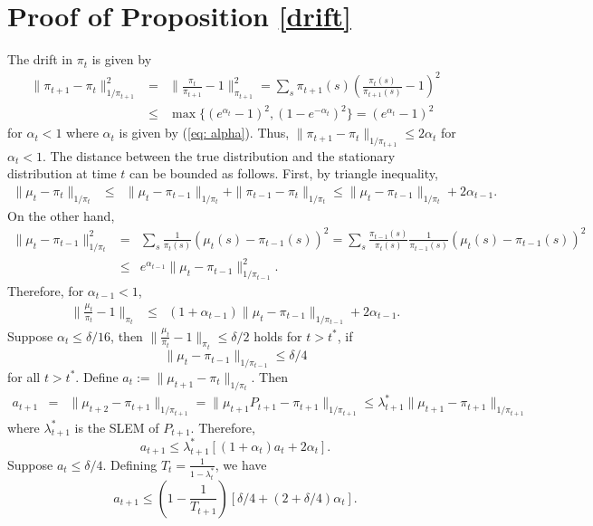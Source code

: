 \documentclass[10pt,onecolumn,draftclsnofoot,journal]{IEEEtran}
\begin{document}
\section{Proof of Proposition \ref{drift}}
The drift in $\pi_t$ is given by
\begin{eqnarray*}
\|\pi_{t+1}-\pi_t\|^2_{1/\pi_{t+1}} &=&\|\frac{\pi_{t}}{\pi_{t+1}}-1\|^2_{\pi_{t+1}} = \sum_s \pi_{t+1}(s)(\frac{\pi_{t}(s)}{\pi_{t+1}(s)}-1)^2\\
& \leq & \max \{(e^{\alpha_t}-1)^2,(1-e^{-\alpha_t})^2\} = (e^{\alpha_t}-1)^2
\end{eqnarray*}
for $\alpha_t <1$ where $\alpha_t$ is given by (\ref{eq: alpha}). Thus, $
\|\pi_{t+1}-\pi_t\|_{1/\pi_{t+1}} \leq 2 \alpha_t
$
for $\alpha_t <1$.
The distance between the true distribution and the stationary distribution at time $t$ can be bounded as follows.
First, by triangle inequality,
\begin{eqnarray*}
\|\mu_t-\pi_t\|_{1/\pi_{t}} &\leq & \|\mu_t-\pi_{t-1}\|_{1/\pi_{t}}+\|\pi_{t-1}-\pi_{t}\|_{1/\pi_{t}}\leq  \|\mu_t-\pi_{t-1}\|_{1/\pi_{t}} + 2 \alpha_{t-1}.
\end{eqnarray*}
On the other hand,
\begin{eqnarray*}
\|\mu_t-\pi_{t-1}\|^2_{1/\pi_{t}} & =& \sum_{s}\frac{1}{\pi_t(s)}(\mu_t(s)-\pi_{t-1}(s))^2 =  \sum_{s}\frac{\pi_{t-1}(s)}{\pi_t(s)}\frac{1}{\pi_{t-1}(s)}(\mu_t(s)-\pi_{t-1}(s))^2\\
& \leq & e^{\alpha_{t-1}} \|\mu_t-\pi_{t-1}\|^2_{1/\pi_{t-1}}.
\end{eqnarray*}
Therefore, for $\alpha_{t-1} < 1$,
\begin{eqnarray*}
\|\frac{\mu_t}{\pi_t}-1\|_{\pi_t} & \leq & (1+\alpha_{t-1})\|\mu_t-\pi_{t-1}\|_{1/\pi_{t-1}}+2 \alpha_{t-1}.
\end{eqnarray*}
Suppose $\alpha_t \leq \delta/16$, then $\|\frac{\mu_t}{\pi_t}-1\|_{\pi_t} \leq \delta/2$ holds for $t> t^*$, if
$$
\|\mu_t-\pi_{t-1}\|_{1/\pi_{t-1}} \leq \delta/4
$$
for all $t > t^*$. Define $a_t:= \|\mu_{t+1}-\pi_{t}\|_{1/\pi_{t}}$. Then
\begin{eqnarray*}
a_{t+1} &=& \|\mu_{t+2}-\pi_{t+1}\|_{1/\pi_{t+1}} =\|\mu_{t+1}P_{t+1}-\pi_{t+1}\|_{1/\pi_{t+1}}\leq  \lambda^*_{t+1}\|\mu_{t+1}-\pi_{t+1}\|_{1/\pi_{t+1}}
\end{eqnarray*}
where $\lambda^*_{t+1}$ is the SLEM of $P_{t+1}$.
Therefore,
$$
a_{t+1} \leq \lambda^*_{t+1} [(1+\alpha_t) a_t + 2 \alpha_t].
$$
Suppose $a_{t} \leq \delta/4$. Defining $T_t=\frac{1}{1-\lambda^*_t}$, we have
$$
a_{t+1} \leq (1-\frac{1}{T_{t+1}})[\delta/4+(2+\delta/4)\alpha_t].
$$
\end{document}
